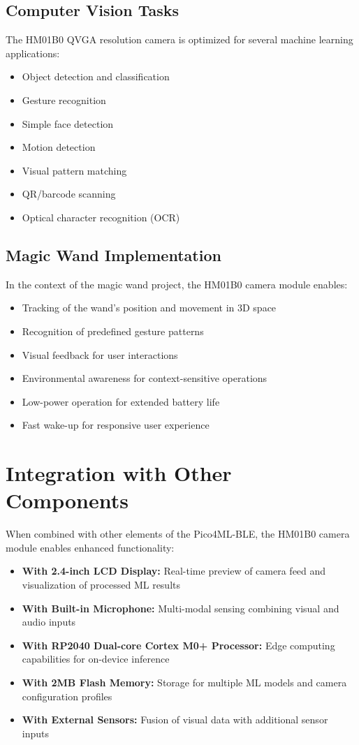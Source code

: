 \subsection{Computer Vision Tasks}
The HM01B0 QVGA resolution camera is optimized for several machine learning applications:
\begin{itemize}
	\item Object detection and classification
	\item Gesture recognition
	\item Simple face detection
	\item Motion detection
	\item Visual pattern matching
	\item QR/barcode scanning
	\item Optical character recognition (OCR)
\end{itemize}

\subsection{Magic Wand Implementation}
In the context of the magic wand project, the HM01B0 camera module enables:
\begin{itemize}
	\item Tracking of the wand's position and movement in 3D space
	\item Recognition of predefined gesture patterns
	\item Visual feedback for user interactions
	\item Environmental awareness for context-sensitive operations
	\item Low-power operation for extended battery life
	\item Fast wake-up for responsive user experience
\end{itemize}

\section{Integration with Other Components}
When combined with other elements of the Pico4ML-BLE, the HM01B0 camera module enables enhanced functionality:
\begin{itemize}
	\item \textbf{With 2.4-inch LCD Display:} Real-time preview of camera feed and visualization of processed ML results \cite{Arducam:2023}
	\item \textbf{With Built-in Microphone:} Multi-modal sensing combining visual and audio inputs
	\item \textbf{With RP2040 Dual-core Cortex M0+ Processor:} Edge computing capabilities for on-device inference
	\item \textbf{With 2MB Flash Memory:} Storage for multiple ML models and camera configuration profiles
	\item \textbf{With External Sensors:} Fusion of visual data with additional sensor inputs
\end{itemize}

